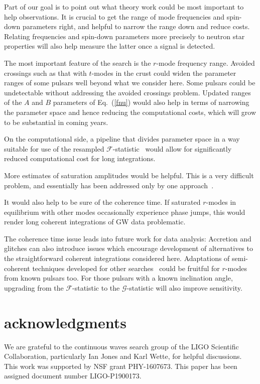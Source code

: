 \documentclass{ttuthes2007}
\begin{document}
Part of our goal is to point out what theory work could be most important to
help observations.
It is crucial to get the range of mode frequencies and spin-down parameters
right, and helpful to narrow the range down and reduce costs.
Relating frequencies and spin-down parameters more precisely to neutron star
properties will also help measure the latter once a signal is detected.

The most important feature of the search is the $r$-mode frequency range.
Avoided crossings such as that with $t$-modes in the crust could widen the
parameter ranges of some pulsars well beyond what we consider here.
Some pulsars could be undetectable without addressing the avoided crossings
problem.
Updated ranges of the $A$ and $B$ parameters of Eq.~(\ref{fnu}) would also
help in terms of narrowing the parameter space and hence reducing the
computational costs, which will grow to be substantial in coming years.

On the computational side, a pipeline that divides parameter space in a way
suitable for use of the resampled $\mathcal{F}$-statistic~\cite{Patel:2009qe}
would allow for significantly reduced computational cost for long
integrations.

More estimates of saturation amplitudes would be helpful.
This is a very difficult problem, and essentially has been addressed only by
one approach~\cite{Arras:2002dw}.

It would also help to be sure of the coherence time.
If saturated $r$-modes in equilibrium with other modes occasionally experience
phase jumps, this would render long coherent integrations of \ac{GW} data
problematic.

The coherence time issue leads into future work for data analysis:
Accretion and glitches can also introduce issues which encourage development
of alternatives to the straightforward coherent integrations considered here.
Adaptations of semi-coherent techniques developed for other
searches~\cite{Sun:2017zge, Suvorova:2017dpm, Dergachev:2011pd,
Ashton:2018qth} could be fruitful for $r$-modes from known pulsars too.
For those pulsars with a known inclination angle, upgrading from the
$\mathcal{F}$-statistic to the $\mathcal{G}$-statistic will also improve
sensitivity.

\section*{acknowledgments}

We are grateful to the continuous waves search group of the LIGO Scientific
Collaboration, particularly Ian Jones and Karl Wette, for helpful discussions.
This work was supported by NSF grant PHY-1607673.
This paper has been assigned document number LIGO-P1900173.
\end{document}
